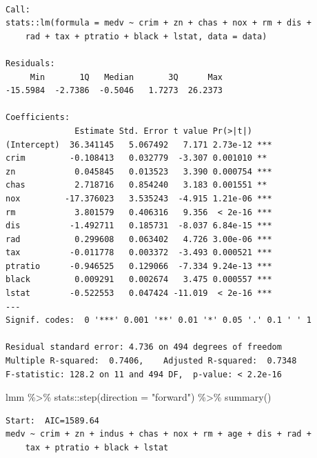 \documentclass[
  letterpaper,
  DIV=11,
  numbers=noendperiod]{scrreprt}
\newenvironment{Shaded}{\begin{snugshade}}{\end{snugshade}}
\newcommand{\AttributeTok}[1]{\textcolor[rgb]{0.65,0.35,0.00}{#1}}
\newcommand{\FunctionTok}[1]{\textcolor[rgb]{0.02,0.16,0.49}{#1}}
\newcommand{\NormalTok}[1]{\textcolor[rgb]{0.33,0.33,0.33}{#1}}
\newcommand{\SpecialCharTok}[1]{\textcolor[rgb]{0.00,0.46,0.62}{#1}}
\newcommand{\StringTok}[1]{\textcolor[rgb]{0.00,0.50,0.00}{#1}}
\begin{document}
\begin{verbatim}

Call:
stats::lm(formula = medv ~ crim + zn + chas + nox + rm + dis + 
    rad + tax + ptratio + black + lstat, data = data)

Residuals:
     Min       1Q   Median       3Q      Max 
-15.5984  -2.7386  -0.5046   1.7273  26.2373 

Coefficients:
              Estimate Std. Error t value Pr(>|t|)    
(Intercept)  36.341145   5.067492   7.171 2.73e-12 ***
crim         -0.108413   0.032779  -3.307 0.001010 ** 
zn            0.045845   0.013523   3.390 0.000754 ***
chas          2.718716   0.854240   3.183 0.001551 ** 
nox         -17.376023   3.535243  -4.915 1.21e-06 ***
rm            3.801579   0.406316   9.356  < 2e-16 ***
dis          -1.492711   0.185731  -8.037 6.84e-15 ***
rad           0.299608   0.063402   4.726 3.00e-06 ***
tax          -0.011778   0.003372  -3.493 0.000521 ***
ptratio      -0.946525   0.129066  -7.334 9.24e-13 ***
black         0.009291   0.002674   3.475 0.000557 ***
lstat        -0.522553   0.047424 -11.019  < 2e-16 ***
---
Signif. codes:  0 '***' 0.001 '**' 0.01 '*' 0.05 '.' 0.1 ' ' 1

Residual standard error: 4.736 on 494 degrees of freedom
Multiple R-squared:  0.7406,    Adjusted R-squared:  0.7348 
F-statistic: 128.2 on 11 and 494 DF,  p-value: < 2.2e-16
\end{verbatim}

\begin{Shaded}
\begin{Highlighting}[]
\NormalTok{lmm }\SpecialCharTok{\%\textgreater{}\%}\NormalTok{ stats}\SpecialCharTok{::}\FunctionTok{step}\NormalTok{(}\AttributeTok{direction =} \StringTok{"forward"}\NormalTok{) }\SpecialCharTok{\%\textgreater{}\%} \FunctionTok{summary}\NormalTok{()}
\end{Highlighting}
\end{Shaded}

\begin{verbatim}
Start:  AIC=1589.64
medv ~ crim + zn + indus + chas + nox + rm + age + dis + rad + 
    tax + ptratio + black + lstat
\end{verbatim}
\end{document}
